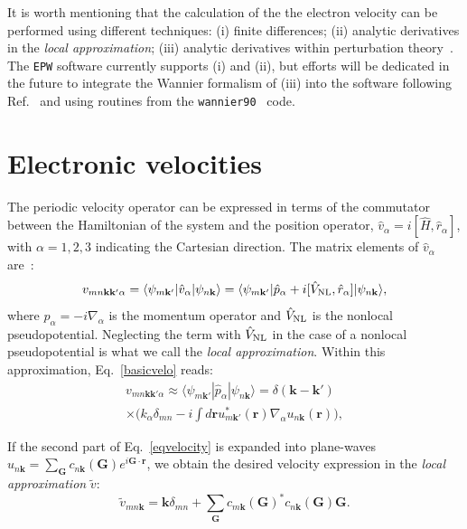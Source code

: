 \documentclass[final,3p,times,twocolumn]{elsarticle}
\newcounter{bla}
\begin{document}
It is worth mentioning that the calculation of the the electron velocity can be performed using different techniques: (i) finite differences; (ii) analytic derivatives in the \textit{local approximation}; (iii) analytic derivatives within perturbation theory~\cite{Ashcroft1976,Yates2007,Janssen2016}. 
The \texttt{EPW} software currently supports (i) and (ii), but efforts will be dedicated in the future to integrate the Wannier formalism of (iii) into the software following Ref.~\cite{Yates2007} and using routines from the \texttt{wannier90}~\cite{Mostofi2008} code. 


\section{Electronic velocities}\label{veloelectro}

The periodic velocity operator can be expressed in terms of the commutator between the Hamiltonian of the system and the position operator, $\hat{v}_\alpha = i[\hat{H},\hat{r}_\alpha]$, with $\alpha=1,2,3$ indicating the Cartesian direction. The matrix elements of $\hat{v}_\alpha$ are~\cite{Starace1971,Read1991,Ismail-Beigi2001,Pickard2003}:
\begin{equation}\label{basicvelo}
v_{mn\mathbf{kk'}\alpha} = \langle  \psi_{m\mathbf{k'}}  | \hat{v}_\alpha | \psi_{n\mathbf{k}} \rangle = \langle \psi_{m\mathbf{k'}}  | \hat{p}_\alpha +i[\hat{V}_{\rm NL},\hat{r}_\alpha] | \psi_{n\mathbf{k}}  \rangle, 
\end{equation}
where $\hat{p}_\alpha = -i \nabla_\alpha$ is the momentum operator and $\hat{V}_{\rm NL}$ is the nonlocal pseudopotential. 
Neglecting the term with $\hat{V}_{\rm NL}$ in the case of a nonlocal pseudopotential is what we call the \textit{local approximation}. Within this approximation,  Eq.~\eqref{basicvelo} reads:  
\begin{multline}\label{eqvelocity}
v_{mn\mathbf{kk'}\alpha}  \approx \langle \psi_{m\mathbf{k'}} | \hat{p}_\alpha |  \psi_{n\mathbf{k}}  \rangle   = \delta(\mathbf{k-k'})\\
\times \bigg( k_\alpha \delta_{mn} - i\int d\mathbf{r} u_{m\mathbf{k'}}^*(\mathbf{r}) \nabla_\alpha u_{n\mathbf{k}}(\mathbf{r}) \bigg),
\end{multline}

If the second part of Eq.~\eqref{eqvelocity} is expanded into plane-waves $u_{n\mathbf{k}}= \sum_{\mathbf{G}} c_{n\mathbf{k}}(\mathbf{G})e^{i\mathbf{G}\cdot \mathbf{r}}$, we obtain the desired velocity expression in the \textit{local approximation} $\tilde{v}$:
\begin{equation}\label{finalvelo}
\tilde{v}_{mn\mathbf{k}} =   \mathbf{k} \delta_{mn} + \sum_{\mathbf{G}} c_{m\mathbf{k}}(\mathbf{G})^*c_{n\mathbf{k}}(\mathbf{G})\mathbf{G} .
\end{equation}
\end{document}
